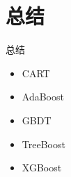
\section{总结}

\begin{frame}{总结}
\begin{itemize}
    \item CART
    \item AdaBoost
    \item GBDT
    \item TreeBoost
    \item XGBoost
\end{itemize}
\end{frame}
